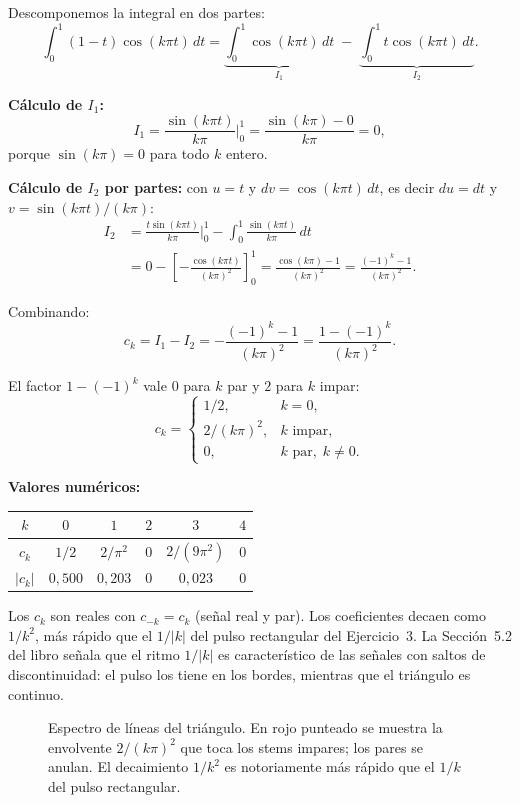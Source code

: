\documentclass[10pt,a4paper]{article}
\begin{document}
	Descomponemos la integral en dos partes:
	\[
		\int_{0}^{1}(1 - t)\cos(k\pi t)\,dt
		= \underbrace{\int_{0}^{1}\cos(k\pi t)\,dt}_{I_1} \;-\; \underbrace{\int_{0}^{1} t\cos(k\pi t)\,dt}_{I_2}.
	\]

	\textbf{Cálculo de $I_1$:}
	\[
		I_1 = \frac{\sin(k\pi t)}{k\pi}\bigg|_{0}^{1} = \frac{\sin(k\pi) - 0}{k\pi} = 0,
	\]
	porque $\sin(k\pi) = 0$ para todo $k$ entero.

	\textbf{Cálculo de $I_2$ por partes:} con $u = t$ y $dv = \cos(k\pi t)\,dt$, es decir $du = dt$ y $v = \sin(k\pi t)/(k\pi)$:
	\begin{align*}
		I_2 &= \frac{t\sin(k\pi t)}{k\pi}\bigg|_{0}^{1} - \int_{0}^{1}\frac{\sin(k\pi t)}{k\pi}\,dt \\
		&= 0 - \left[-\frac{\cos(k\pi t)}{(k\pi)^2}\right]_{0}^{1}
		= \frac{\cos(k\pi) - 1}{(k\pi)^2}
		= \frac{(-1)^k - 1}{(k\pi)^2}.
	\end{align*}

	Combinando:
	\[
		c_k = I_1 - I_2 = -\frac{(-1)^k - 1}{(k\pi)^2} = \frac{1 - (-1)^k}{(k\pi)^2}.
	\]

	El factor $1 - (-1)^k$ vale $0$ para $k$ par y $2$ para $k$ impar:
	\[
		\boxed{c_k =
		\begin{cases}
			1/2, & k = 0, \\
			2/(k\pi)^2, & k \text{ impar}, \\
			0, & k \text{ par}, \; k \ne 0.
		\end{cases}}
	\]

	\textbf{Valores numéricos:}
	\begin{center}
		\begin{tabular}{c|ccccc}
			$k$ & $0$ & $1$ & $2$ & $3$ & $4$ \\ \hline
			$c_k$ & $1/2$ & $2/\pi^2$ & $0$ & $2/(9\pi^2)$ & $0$ \\
			$|c_k|$ & $0{,}500$ & $0{,}203$ & $0$ & $0{,}023$ & $0$
		\end{tabular}
	\end{center}

	Los $c_k$ son reales con $c_{-k} = c_k$ (señal real y par). Los coeficientes decaen como $1/k^2$, más rápido que el $1/|k|$ del pulso rectangular del Ejercicio~3. La Sección~5.2 del libro señala que el ritmo $1/|k|$ es característico de las señales con saltos de discontinuidad: el pulso los tiene en los bordes, mientras que el triángulo es continuo.

	\begin{figure}[H]
		\centering
		
		\caption{Espectro de líneas del triángulo. En rojo punteado se muestra la envolvente $2/(k\pi)^2$ que toca los stems impares; los pares se anulan. El decaimiento $1/k^2$ es notoriamente más rápido que el $1/k$ del pulso rectangular.}
		\label{fig:ej4}
	\end{figure}
\end{document}
